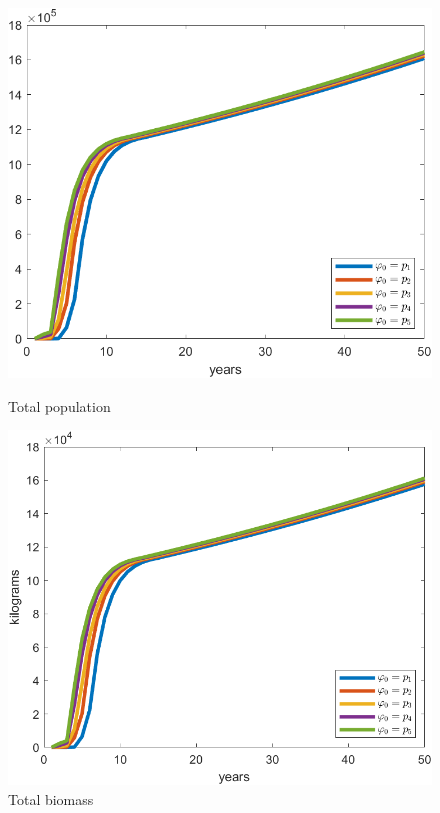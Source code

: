 \begin{figure}[H]
	\centering
	\begin{minipage}{.43\textwidth}
		\includegraphics[width=\linewidth]{Images/F=1000/total_pop_when_f=1000}
		\caption{Total population}
		\label{fig:totalpopwhenf=1000}
	\end{minipage} \quad 
	\centering
	\begin{minipage}{.43\textwidth}
		\includegraphics[width=\linewidth]{Images/F=1000/total_biomass_when_f=1000}
		\caption{Total biomass}
		\label{fig:totalbiomasswhenf=1000}
	\end{minipage}
\end{figure}

